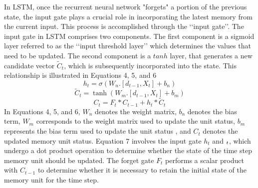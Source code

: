\documentclass{article}
\begin{document}
In LSTM, once the recurrent neural network "forgets" a portion of the previous state, the input gate plays a crucial role in incorporating the latest memory from the current input. This process is accomplished through the ‘‘input gate’’. The input gate in LSTM comprises two components. The first component is a sigmoid layer referred to as the ‘‘input threshold layer’’ which determines the values that need to be updated. The second component is a  $tanh$ layer, that generates a new candidate vector $\tilde{C}_t$, which is subsequently incorporated into the state. This relationship is illustrated in Equations 4, 5, and 6
\begin{equation}
h_t=\sigma (W_n.[d_{t-1},X_t] + b_n)
\end{equation}
\begin{equation}
\tilde{C}_t=\tanh (W_m.[d_{t-1},X_t] + b_m)
\end{equation}
\begin{equation}
C_t=F_t*C_{t-1} +h_t*\tilde{C}_t
\end{equation}
In Equations 4, 5, and 6, $W_n$ denotes the weight matrix, $b_n$ denotes the bias term, $W_m$ corresponds to the weight matrix used to update the unit status, $b_m$ represents the bias term used to update the unit status \cite{wang2019forecasting}, and $C_t$ denotes the updated memory unit status. Equation 7 involves the input gate  $h_t$ and $\title{C}_t$, which undergo a dot product operation to determine whether the state of the time step memory unit should be updated. The forget gate $F_t$ performs a scalar product with  $C_{t-1}$ to determine whether it is necessary to retain the initial state of the memory unit for the time step.  
\end{document}
